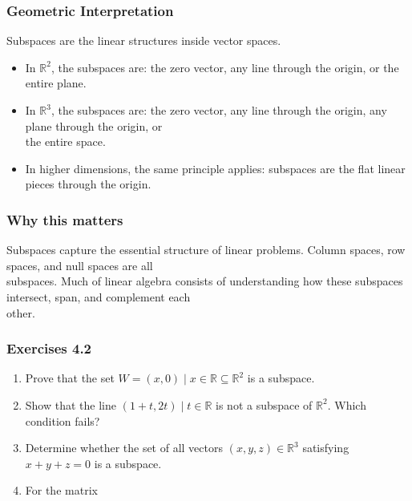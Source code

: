 \documentclass[
  12pt,
  a4paper,
]{article}
\begin{document}
\subsubsection{Geometric
Interpretation}\label{geometric-interpretation-5}

Subspaces are the linear structures inside vector spaces.

\begin{itemize}
\item
  In \(\mathbb{R}^2\), the subspaces are: the zero vector, any line
  through the origin, or the entire plane.
\item
  In \(\mathbb{R}^3\), the subspaces are: the zero vector, any line
  through the origin, any plane through the origin, or\\
  the entire space.
\item
  In higher dimensions, the same principle applies: subspaces are the
  flat linear pieces through the origin.
\end{itemize}

\subsubsection{Why this matters}\label{why-this-matters-13}

Subspaces capture the essential structure of linear problems. Column
spaces, row spaces, and null spaces are all\\
subspaces. Much of linear algebra consists of understanding how these
subspaces intersect, span, and complement each\\
other.

\subsubsection{Exercises 4.2}\label{exercises-42}

\begin{enumerate}
\def\labelenumi{\arabic{enumi}.}
\item
  Prove that the set
  \(W = { (x,0) \mid x \in \mathbb{R} } \subseteq \mathbb{R}^2\) is a
  subspace.
\item
  Show that the line \({ (1+t, 2t) \mid t \in \mathbb{R} }\) is not a
  subspace of \(\mathbb{R}^2\). Which condition fails?
\item
  Determine whether the set of all vectors \((x,y,z) \in \mathbb{R}^3\)
  satisfying \(x+y+z=0\) is a subspace.
\item
  For the matrix
\end{enumerate}
\end{document}
